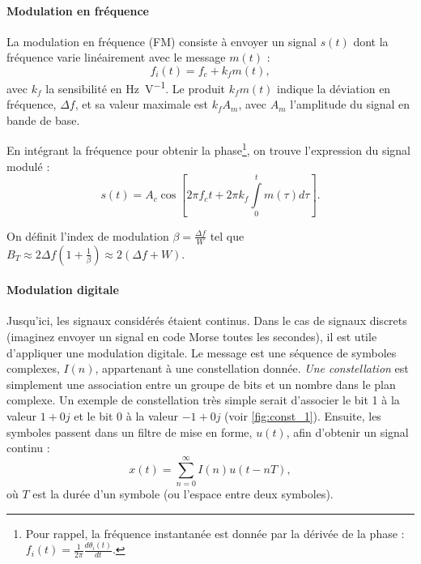 \documentclass [a4paper, 11pt] {article}
\begin{document}
    \paragraph{Modulation en fréquence} La modulation en fréquence (FM) consiste à envoyer un signal $s(t)$ dont la fréquence varie linéairement avec le message $m(t)$ :
    \begin{equation}
        f_i(t) = f_c + k_f m(t),
    \end{equation}
    avec $k_f$ la sensibilité en \si{\hertz\per\volt}. Le produit $k_f m(t)$ indique la déviation en fréquence, $\Delta f$, et sa valeur maximale est $k_f A_m$, avec $A_m$ l'amplitude du signal en bande de base.
    
    En intégrant la fréquence pour obtenir la phase\footnote{Pour rappel, la fréquence instantanée est donnée par la dérivée de la phase : $f_i(t) = \frac{1}{2\pi}\frac{d\theta_i (t)}{dt}$.}, on trouve l'expression du signal modulé :
    \begin{equation}
        s(t) = A_c \cos \left[2\pi f_c t + 2\pi k_f \int\limits_0^t m(\tau)d\tau \right].
    \end{equation}
    
    On définit l'index de modulation $\beta=\frac{\Delta f}{W}$ tel que $B_T \approx 2\Delta f \left(1 + \frac{1}{\beta}\right)\approx 2\left(\Delta f + W\right)$.
    
    \pagebreak
    \pagestyle{nextpages}
    
    \paragraph{Modulation digitale} Jusqu'ici, les signaux considérés étaient continus. Dans le cas de signaux discrets (imaginez envoyer un signal en code Morse toutes les secondes), il est utile d'appliquer une modulation digitale. Le message est une séquence de symboles complexes, $I(n)$, appartenant à une constellation donnée. \textit{Une constellation} est simplement une association entre un groupe de bits et un nombre dans le plan complexe. Un exemple de constellation très simple serait d'associer le bit 1 à la valeur $1+0j$ et le bit 0 à la valeur $-1+0j$ (voir \autoref{fig:const_1}). Ensuite, les symboles passent dans un filtre de mise en forme, $u(t)$, afin d'obtenir un signal continu :
    \begin{equation}
        x(t) = \sum\limits_{n=0}^{\infty}I(n) u(t-nT),
    \end{equation}
    où $T$ est la durée d'un symbole (ou l'espace entre deux symboles).
    
\end{document}
